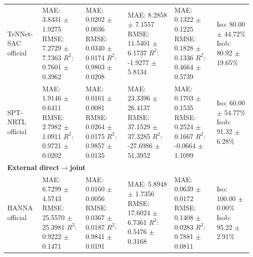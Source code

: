 \begin{tabular}{llllll}
TeNNet-SAC official & \shortstack[l]{MAE: 3.8331 $\pm$ 1.9275 \\ RMSE: 7.2729 $\pm$ 7.7363 \\ $R^2$: 0.7601 $\pm$ 0.3962} & \shortstack[l]{MAE: 0.0202 $\pm$ 0.0036 \\ RMSE: 0.0340 $\pm$ 0.0174 \\ $R^2$: 0.9803 $\pm$ 0.0208} & \shortstack[l]{MAE: 8.2858 $\pm$ 7.1557 \\ RMSE: 11.5401 $\pm$ 6.1737 \\ $R^2$: -1.9277 $\pm$ 5.8134} & \shortstack[l]{MAE: 0.1322 $\pm$ 0.1225 \\ RMSE: 0.1828 $\pm$ 0.1336 \\ $R^2$: 0.4664 $\pm$ 0.5739} & \shortstack[l]{Iso: 80.00 $\pm$ 44.72\% \\ Isob: 80.92 $\pm$ 19.65\%} \\
SPT-NRTL official & \shortstack[l]{MAE: 1.9146 $\pm$ 0.6411 \\ RMSE: 2.7982 $\pm$ 1.0911 \\ $R^2$: 0.9721 $\pm$ 0.0202} & \shortstack[l]{MAE: 0.0161 $\pm$ 0.0081 \\ RMSE: 0.0264 $\pm$ 0.0175 \\ $R^2$: 0.9857 $\pm$ 0.0135} & \shortstack[l]{MAE: 23.3396 $\pm$ 26.4137 \\ RMSE: 37.1529 $\pm$ 37.3285 \\ $R^2$: -27.6986 $\pm$ 51.3952} & \shortstack[l]{MAE: 0.1703 $\pm$ 0.1535 \\ RMSE: 0.2524 $\pm$ 0.1667 \\ $R^2$: -0.0664 $\pm$ 1.1099} & \shortstack[l]{Iso: 60.00 $\pm$ 54.77\% \\ Isob: 91.32 $\pm$ 6.28\%} \\
\hline
\multicolumn{6}{l}{\textbf{External direct$\to$joint}} \\
HANNA official & \shortstack[l]{MAE: 6.7299 $\pm$ 4.5743 \\ RMSE: 25.5570 $\pm$ 25.3981 \\ $R^2$: 0.9222 $\pm$ 0.1471} & \shortstack[l]{MAE: 0.0160 $\pm$ 0.0056 \\ RMSE: 0.0367 $\pm$ 0.0187 \\ $R^2$: 0.9841 $\pm$ 0.0191} & \shortstack[l]{MAE: 5.8948 $\pm$ 1.7356 \\ RMSE: 17.6024 $\pm$ 6.7361 \\ $R^2$: 0.5476 $\pm$ 0.3168} & \shortstack[l]{MAE: 0.0639 $\pm$ 0.0172 \\ RMSE: 0.1408 $\pm$ 0.0283 \\ $R^2$: 0.7881 $\pm$ 0.0811} & \shortstack[l]{Iso: 100.00 $\pm$ 0.00\% \\ Isob: 95.22 $\pm$ 2.91\%} \\

\end{tabular}
